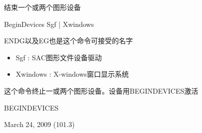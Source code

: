 \label{cmd:enddevices}

结束一个或两个图形设备

BeginDevices Sgf | Xwindows

ENDG以及EG也是这个命令可接受的名字

\begin{itemize}
\item Sgf : SAC图形文件设备驱动
\item Xwindows : X-windows窗口显示系统
\end{itemize}

这个命令终止一或两个图形设备。设备用BEGINDEVICES激活

BEGINDEVICES

March 24, 2009 (101.3)
